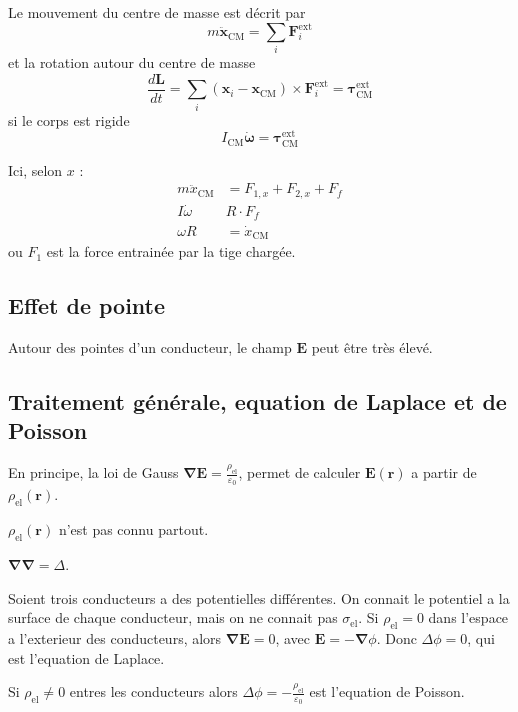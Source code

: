 \begin{example}
Le mouvement du centre de masse est décrit par 
$$
m\ddot{\boldsymbol{x}}_{\mathrm{CM}}=\sum _{i} \boldsymbol{F}^{\mathrm{ext}}_{i}
$$
et la rotation autour du centre de masse
$$
\frac{d\boldsymbol{L}}{dt}=\sum _{i}(\boldsymbol{x}_{i}-\boldsymbol{x}_{\mathrm{CM}})\times \boldsymbol{F}^{\mathrm{ext}}_{i}=\boldsymbol{\tau}_{\mathrm{CM}}^{\mathrm{ext}}
$$
si le corps est rigide
$$
I_{\mathrm{CM}} \dot{\boldsymbol{\omega}}=\boldsymbol{\tau}_{\mathrm{CM}}^{\mathrm{ext}}
$$

Ici, selon $x$ :
\begin{align*}
m \ddot{x}_{\mathrm{CM}} & =F_{1,x}+F_{2,x}+F_{f} \\
 I\dot{\omega} &R\cdot F_{f} \\
 \omega R & =\dot{x}_{\mathrm{CM}}
\end{align*}
ou $F_{1}$ est la force entrainée par la tige chargée.
\end{example}

\subsection{Effet de pointe}
Autour des pointes d'un conducteur, le champ $\boldsymbol{E}$ peut être très élevé.
\subsection{Traitement générale, equation de Laplace et de Poisson}
En principe, la loi de Gauss $\boldsymbol{\nabla E}=\frac{\rho _{\mathrm{el}}}{\varepsilon_{0}}$, permet de calculer $\boldsymbol{E}(\boldsymbol{r})$ a partir de $\rho _{\mathrm{el}}(\boldsymbol{r})$.
\begin{problem}
$\rho _{\mathrm{el}}(\boldsymbol{r})$ n'est pas connu partout.
\end{problem}
\begin{reminder}
$\boldsymbol{\nabla \nabla}=\Delta$.
\end{reminder}
\begin{example}
Soient trois conducteurs a des potentielles différentes. On connait le potentiel a la surface de chaque conducteur, mais on ne connait pas $\sigma _{\mathrm{el}}$. Si $\rho _{\mathrm{el}}=0$ dans l'espace a l'exterieur des conducteurs, alors $\boldsymbol{\nabla E}=0$, avec $\boldsymbol{E}=-\boldsymbol{\nabla}\phi$. Donc $\Delta \phi=0$, qui est l'equation de Laplace.

Si $\rho _{\mathrm{el}}\neq 0$ entres les conducteurs alors $\Delta \phi=-\frac{\rho _{\mathrm{el}}}{\varepsilon_{0}}$ est l'equation de Poisson.
\end{example}

